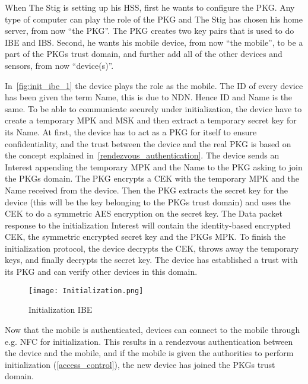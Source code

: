 When The Stig is setting up his \gls{HSS}, first he wants to configure the \gls{PKG}. 
Any type of computer can play the role of the \gls{PKG} and The Stig has chosen his home server, from now ``the PKG''.
The \gls{PKG} creates two key pairs that is used to do \gls{IBE} and \gls{IBS}.
Second, he wants his mobile device, from now ``the mobile'', to be a part of the \gls{PKG}s trust domain, and further add all of the other devices and sensors, from now ``device(s)''.

In~\autoref{fig:init_ibe_1} the device plays the role as the mobile. 
The \gls{ID} of every device has been given the term Name, this is due to \gls{NDN}. 
Hence \gls{ID} and Name is the same.
To be able to communicate securely under initialization, the device have to create a temporary \gls{MPK} and \gls{MSK} and then extract a temporary secret key for its Name. 
At first, the device has to act as a \gls{PKG} for itself to ensure confidentiality, and the trust between the device and the real \gls{PKG} is based on the concept explained in~\autoref{rendezvous_authentication}.
The device sends an Interest appending the temporary \gls{MPK} and the Name to the \gls{PKG} asking to join the \gls{PKG}s domain.
The \gls{PKG} encrypts a \gls{CEK} with the temporary \gls{MPK} and the Name received from the device. 
Then the \gls{PKG} extracts the secret key for the device (this will be the key belonging to the \gls{PKG}s trust domain) and uses the \gls{CEK} to do a symmetric \gls{AES} encryption on the secret key. 
The Data packet response to the initialization Interest will contain the identity-based encrypted \gls{CEK}, the symmetric encrypted secret key and the \gls{PKG}s \gls{MPK}.
To finish the initialization protocol, the device decrypts the \gls{CEK}, throws away the temporary keys, and finally decrypts the secret key.
The device has established a trust with its \gls{PKG} and can verify other devices in this domain. 

\begin{figure}[ht]
  \centering
  \texttt{[image: Initialization.png]}
  \caption{Initialization IBE}
  \label{fig:init_ibe_1}
\end{figure}

Now that the mobile is authenticated, devices can connect to the mobile through e.g. \gls{NFC} for initialization.
This results in a rendezvous authentication between the device and the mobile, and if the mobile is given the authorities to perform initialization (\autoref{access_control}), the new device has joined the \gls{PKG}s trust domain.




